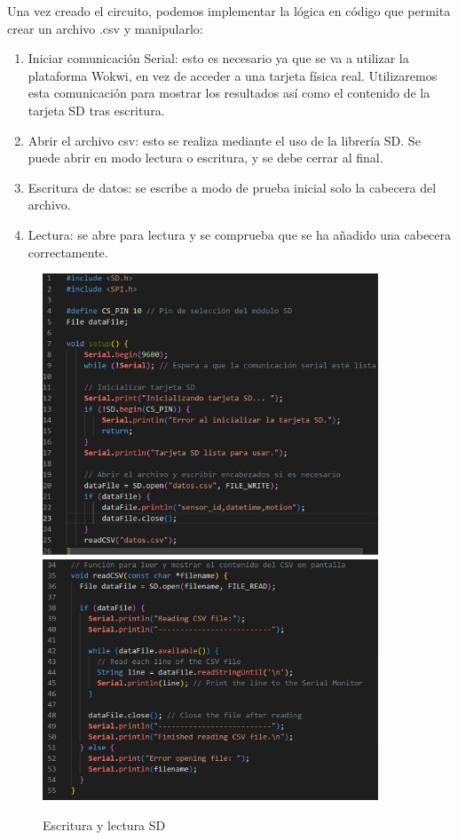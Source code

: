 Una vez creado el circuito, podemos implementar la lógica en código que permita crear un archivo .csv y manipularlo:
\begin{enumerate}

    \item Iniciar comunicación Serial: esto es necesario ya que se va a utilizar la plataforma Wokwi, en vez de acceder a una tarjeta física real. Utilizaremos esta comunicación para mostrar los resultados así como el contenido de la tarjeta SD tras escritura.  

    \item Abrir el archivo csv: esto se realiza mediante el uso de la librería SD. Se puede abrir en modo lectura o escritura, y se debe cerrar al final.
    
    \item Escritura de datos: se escribe a modo de prueba inicial solo la cabecera del archivo.

    \item Lectura: se abre para lectura y se comprueba que se ha añadido una cabecera correctamente.

\end{enumerate}

\begin{figure}[H]
    \centering
    \includegraphics[width = 10cm]{ImagenesLatex/csv_header.JPG}{}
    \includegraphics[width = 10cm]{ImagenesLatex/csv_header_read.JPG}{}
    \caption{Escritura y lectura SD}
\end{figure}

